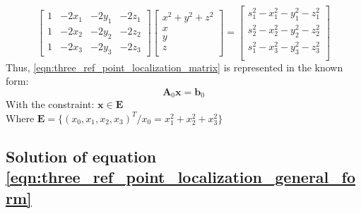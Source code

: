 \documentclass[./main.tex]{subfiles}
\begin{document}
\begin{equation}
    \begin{bmatrix}
        1 & -2x_1 & -2y_1 & -2z_1\\
        1 & -2x_2 & -2y_2 & -2z_2\\
        1 & -2x_3 & -2y_3 & -2z_3
    \end{bmatrix}
    \begin{bmatrix}
        x^2 + y^2 + z^2\\
        x\\
        y\\
        z\\
    \end{bmatrix}
    =
    \begin{bmatrix}
        s_1^2 - x_1^2 - y_1^2 - z_1^2\\
        s_2^2 - x_2^2 - y_2^2 - z_2^2\\
        s_1^2 - x_3^2 - y_3^2 - z_3^2\\
    \end{bmatrix}
    \label{eqn:three_ref_point_localization_matrix}
\end{equation}
Thus, \ref{eqn:three_ref_point_localization_matrix} is represented in the known form:
\begin{equation}
    \mathbf{A}_0 \mathbf{x}=\mathbf{b}_0
    \label{eqn:three_ref_point_localization_general_form}
\end{equation}
With the constraint: $\mathbf{x} \in \mathbf{E}$\\
Where $\mathbf{E}=\{(x_0, x_1, x_2, x_3)^T / x_0 = x_1^2 + x_2^2 + x_3^2 \}$
\subsection{Solution of equation \ref{eqn:three_ref_point_localization_general_form}}
\end{document}
